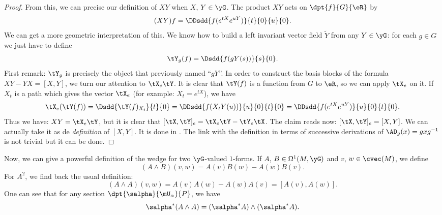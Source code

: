 												\begin{proof}
												From this, we can precise our definition of $XY$ when $X$, $Y\in\yG$. The product $XY$ acts on $\dpt{f}{G}{\eR}$ by
												\[
													(XY)f=\DDsdd{f(e^{tX}e^{uY})}{t}{0}{u}{0}.
													\]
													We can get a more geometric interpretation of this. We know how to build a left invariant vector field $\tilde Y$ from any $Y\in\yG$: for each $g\in G$ we just have to define
													\[
														\tY_g(f)=\Dsdd{f(gY(s))}{s}{0}.
														\]
														First remark: $\tY_g$ is precisely the object that previously named ``$gY$''. In order to construct the basis blocks of the formula $XY-YX=[X,Y]$, we turn our attention to $\tX_e\tY$. It is clear that $\tY(f)$ is a function from $G$ to $\eR$, so we can apply $\tX_e$ on it. If $X_t$ is a path which gives the vector $\tX_e$ (for example: $X_t=e^{tX}$), we have
														\begin{equation}
														\tX_e(\tY(f))=\Dsdd{\tY(f)_{X_t}}{t}{0}\\
																					=\DDsdd{f(X_tY(u))}{u}{0}{t}{0}\\
																					=\DDsdd{f(e^{tX}e^{uY})}{u}{0}{t}{0}.
																					\end{equation}
																					Thus we have: $XY=\tX_e\tY$, but it is clear that $[\tX,\tY]_e=\tX_e\tY-\tY_e\tX$. The claim reads now: $[\tX,\tY]_e=[X,Y]$. We can actually take it as de \emph{definition} of $[X,Y]$. It is done in \cite{Helgason}. The link with the definition in terms of successive derivations of $\AD_g(x)=gxg^{-1}$ is not trivial but it can be done.
																					\end{proof}



																					Now, we can give a powerful definition of the wedge for two $\yG$-valued $1$-forms. If $A$, $B\in\Omega^1(M,\yG)$ and $v$, $w\in\cvec(M)$, we define
																					\begin{equation}
																					(A\wedge B)(v,w)=A(v)B(w)-A(w)B(v).
																					\end{equation}
																					For $A^2$, we find back the usual definition:
																					\[
																						(A\wedge A)(v,w)=A(v)A(w)-A(w)A(v)=[A(v),A(w)].
																						\]
																						One can see that for any section $\dpt{\salpha}{\mU_{\alpha}}{P}$, we have
																						\begin{equation}\label{eq:1907r2}
																						\salpha^*(A\wedge A)=(\salpha^*A)\wedge(\salpha^*A).
																						\end{equation}


